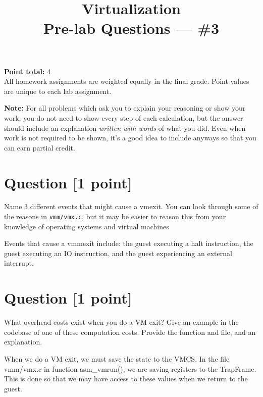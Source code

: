 \documentclass[11pt]{article}
\providecommand{\due}{}
\begin{document}
\title{Virtualization\\Pre-lab Questions --- \#3}
\date{\due}

\maketitle

\noindent \textbf{Point total:} 4
\\ All homework assignments are weighted equally in the final grade. Point values are unique to each lab assignment.

\textbf{Note:} For all problems which ask you to explain your reasoning or show your work, you do not need to show every step of each calculation, but the answer should include an explanation \emph{written with words} of what you did.  Even when work is not required to be shown, it’s a good idea to include anyways so that you can earn partial credit.

\section{Question [1 point]}

Name 3 different events that might cause a vmexit. You can look through some of the reasons in \texttt{vmm/vmx.c}, but it may be easier to reason this from your knowledge of operating systems and virtual machines

\begin{solution}
Events that cause a vmmexit include: the guest executing a halt instruction, the guest executing an IO instruction, and the guest experiencing an external interrupt.
\end{solution}


\section{Question [1 point]}

What overhead costs exist when you do a VM exit? Give an example in the codebase of one of these computation costs. Provide the function and file, and an explanation.

\begin{solution}
When we do a VM exit, we must save the state to the VMCS. In the file vmm/vmx.c in function asm\_vmrun(), we are saving registers to the TrapFrame. This is done so that we may have access to these values when we return to the guest.
\end{solution}
\end{document}
